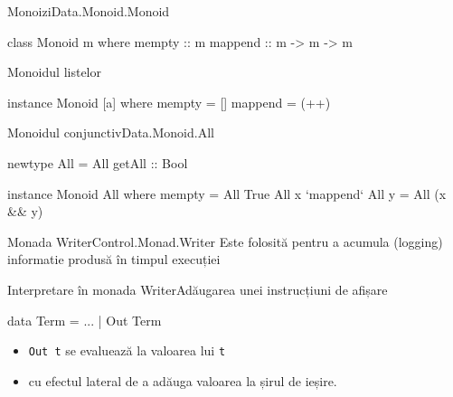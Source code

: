 \documentclass[xcolor=pdftex,romanian,colorlinks]{beamer}
\begin{document}
\begin{frame}[fragile]{Monoizi}{Data.Monoid.Monoid}
\begin{asciihs}
class Monoid m where
    mempty  :: m
    mappend :: m -> m -> m
\end{asciihs}

\begin{block}{Monoidul listelor}
\begin{asciihs}
instance Monoid [a] where
    mempty  = []
    mappend = (++)
\end{asciihs}
\end{block}
\begin{block}{Monoidul conjunctiv\hfill Data.Monoid.All}
\vspace{-2ex}
\begin{asciihs}
newtype All = All { getAll :: Bool }

instance Monoid All where
        mempty = All True
        All x `mappend` All y = All (x && y)
\end{asciihs}
\end{block}
\end{frame}

\begin{frame}[fragile]{Monada Writer}{Control.Monad.Writer}
Este folosită pentru a acumula (logging) informatie produsă în timpul execuției
\end{frame}

\begin{frame}[fragile]{Interpretare în monada Writer}{Adăugarea unei instrucțiuni de afișare}
\begin{asciihs}
data Term = ... | Out Term
\end{asciihs}





\begin{itemize}
\item \lstinline$Out t$ se evaluează la valoarea lui \lstinline$t$ 
\item cu efectul lateral de a adăuga valoarea la șirul de ieșire.
\end{itemize}
\end{frame}
\end{document}
